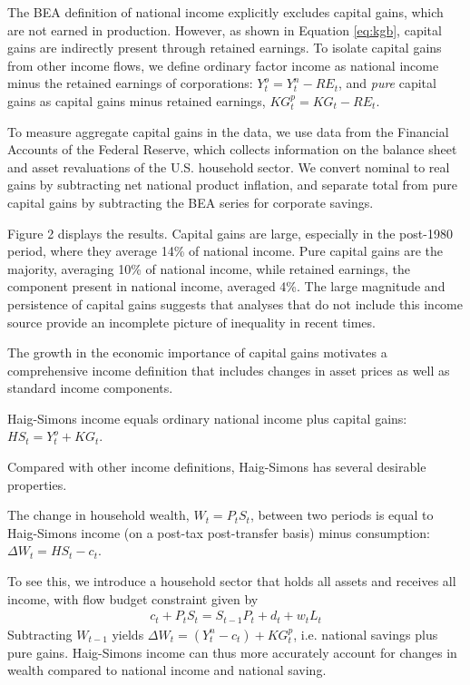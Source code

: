 \documentclass[12pt]{article}
\begin{document}
The BEA definition of national income explicitly excludes capital gains, which are not earned in production. However, as shown in Equation \ref{eq:kgb}, capital gains are indirectly present through retained earnings. To isolate capital gains from other income flows, we define ordinary factor income as national income minus the retained earnings of corporations: $Y^{o}_t = Y^n_t - RE_t$, and \textit{pure} capital gains as capital gains minus retained earnings, $KG^p_t = KG_t - RE_t$. 

To measure aggregate capital gains in the data, we use data from the Financial Accounts of the Federal Reserve, which collects information on the balance sheet and asset revaluations of the U.S. household sector. We convert nominal to real gains by subtracting net national product inflation, and separate total from pure capital gains by subtracting the BEA series for corporate savings. 

Figure 2 displays the results. Capital gains are large, especially in the post-1980 period, where they average 14\% of national income. Pure capital gains are the majority, averaging 10\% of national income, while retained earnings, the component present in national income, averaged 4\%. The large magnitude and persistence of capital gains suggests that analyses that do not include this income source provide an incomplete picture of inequality in recent times.

The growth in the economic importance of capital gains motivates a comprehensive income definition that includes changes in asset prices as well as standard income components. 
\begin{definition} \label{def:hs} Haig-Simons income \citep{haig1921concept, simons1938personal} equals ordinary national income plus capital gains: $HS_t = Y_t^{o} + KG_t$. \end{definition} 


Compared with other income definitions, Haig-Simons has several desirable properties. 
\begin{remark} \label{remark:hs_sav} The change in household wealth, $W_t = P_t S_t$, between two periods is equal to Haig-Simons income (on a post-tax post-transfer basis) minus consumption: $\Delta W_t = HS_t - c_t$. \end{remark} 
\noindent To see this, we introduce a household sector that holds all assets and receives all income, with flow budget constraint given by 
\begin{align}
\label{eq:agent_bc}
c_t +  P_t S_t = S_{t-1}P_t + d_t +  w_t L_t  
\end{align}
Subtracting $W_{t-1}$ yields $\Delta W_t = (Y_t^n - c_t) + KG_t^p$, i.e. national savings plus pure gains. Haig-Simons income can thus more accurately account for changes in wealth compared to national income and national saving. 
\end{document}
